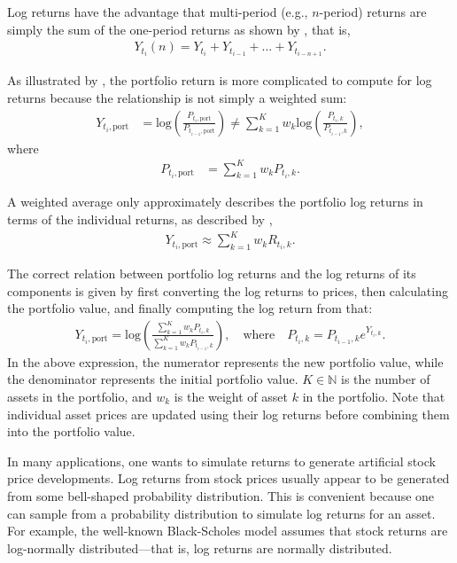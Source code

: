 Log returns have the advantage that multi-period (e.g., $n$-period) returns are simply the sum of the one-period returns as shown by , that is, 
\begin{align*}
    Y_{t_i}(n) = Y_{t_i} + Y_{t_{i-1}} + \dots + Y_{t_{i-n+1}}.
\end{align*}

As illustrated by \citet[p.~4]{Danielsson2011}, the portfolio return is more complicated to compute for log returns because the relationship is not simply a weighted sum:
\begin{align*}
        Y_{t_i,\mathrm{port}} &= \mathrm{log}\left(\frac{P_{t_i,\mathrm{port}}}{P_{t_{i-1},\mathrm{port}}}\right) \neq  \sum_{k=1}^K w_k \mathrm{log}\left(\frac{P_{t_i,k}}{P_{t_{i-1},k}}\right),        
\end{align*}
where 
\begin{align*}
    P_{t_i,\mathrm{port}} &= \sum_{k=1}^K w_k P_{t_i,k}.
\end{align*}


A weighted average only approximately describes the portfolio log returns in terms of the individual returns, as described by ,
\begin{align*}
    Y_{t_i,\mathrm{port}} \approx \sum_{k=1}^K w_k R_{t_i,k}.
\end{align*}

The correct relation between portfolio log returns and the log returns of its components is given by first converting the log returns to prices, then calculating the portfolio value, and finally computing the log return from that:
\begin{align*}
    Y_{t_i,\mathrm{port}} = \mathrm{log} \left( \frac{\sum_{k=1}^K w_k P_{t_i,k}}{\sum_{k=1}^K w_k P_{t_{i-1},k}} \right), \quad \text{where} \quad P_{t_i,k} = P_{t_{i-1},k} e^{Y_{t_i,k}}.
\end{align*}
In the above expression, the numerator represents the new portfolio value, while the denominator represents the initial portfolio value. $K \in \mathbb{N}$ is the number of assets in the portfolio, and $w_k$ is the weight of asset $k$ in the portfolio. Note that individual asset prices are updated using their log returns before combining them into the portfolio value. 

In many applications, one wants to simulate returns to generate artificial stock price developments. Log returns from stock prices usually appear to be generated from some bell-shaped probability distribution. This is convenient because one can sample from a probability distribution to simulate log returns for an asset. For example, the well-known Black-Scholes model assumes that stock returns are log-normally distributed—that is, log returns are normally distributed. 

